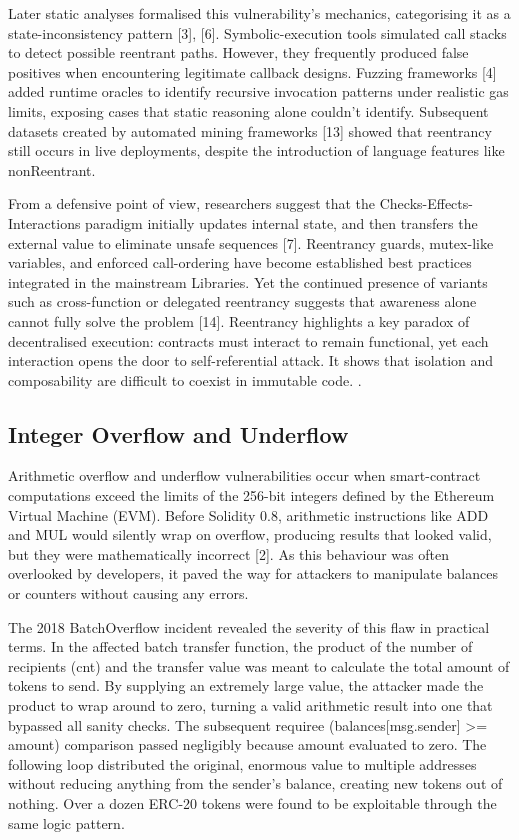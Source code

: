 \documentclass[conference]{IEEEtran}
\begin{document}
Later static analyses formalised this vulnerability’s 
mechanics, categorising it as a state-inconsistency pattern [3], [6].
Symbolic-execution tools simulated call stacks to detect possible
reentrant paths. However, they frequently produced false positives when 
encountering legitimate callback designs. Fuzzing frameworks [4] 
added runtime oracles to identify recursive invocation patterns 
under realistic gas limits, exposing cases that static reasoning alone 
couldn’t identify. Subsequent datasets created by automated 
mining frameworks [13] showed that reentrancy still occurs
in live deployments, despite the introduction of language features 
like nonReentrant.

From a defensive point of view, researchers suggest that the 
Checks-Effects-Interactions paradigm initially updates internal state, 
and then transfers the external value to eliminate unsafe sequences [7]. 
Reentrancy guards, mutex-like variables, and enforced call-ordering 
have become established best practices integrated in the mainstream 
Libraries. Yet the continued presence of variants such as cross-function 
or delegated reentrancy suggests that awareness alone cannot fully 
solve the problem [14]. Reentrancy highlights a key paradox of 
decentralised execution: contracts must interact to remain functional, 
yet each interaction opens the door to self-referential attack. It shows 
that isolation and composability are difficult to coexist in immutable code.
.

\subsection{Integer Overflow and Underflow}
Arithmetic overflow and underflow vulnerabilities occur when smart-contract computations exceed the limits of the 256-bit integers defined by the Ethereum Virtual Machine (EVM). Before Solidity 0.8, arithmetic instructions like ADD and MUL would silently wrap on overflow, producing results that looked valid, but they were mathematically incorrect [2]. As this behaviour was often overlooked by developers, it paved the way for attackers to manipulate balances or counters without causing any errors.

The 2018 BatchOverflow incident revealed the severity of this flaw in practical terms. In the affected batch transfer function, the product of the number of recipients (cnt) and the transfer value was meant to calculate the total amount of tokens to send. By supplying an extremely large value, the attacker made the product to wrap around to zero, turning a valid arithmetic result into one that bypassed all sanity checks. The subsequent requiree (balances[msg.sender] \textgreater{}= amount) comparison passed negligibly because amount evaluated to zero. The following loop distributed the original, enormous value to multiple addresses without reducing anything from the sender’s balance, creating new tokens out of nothing. Over a dozen ERC-20 tokens were found to be exploitable through the same logic pattern.
\end{document}
